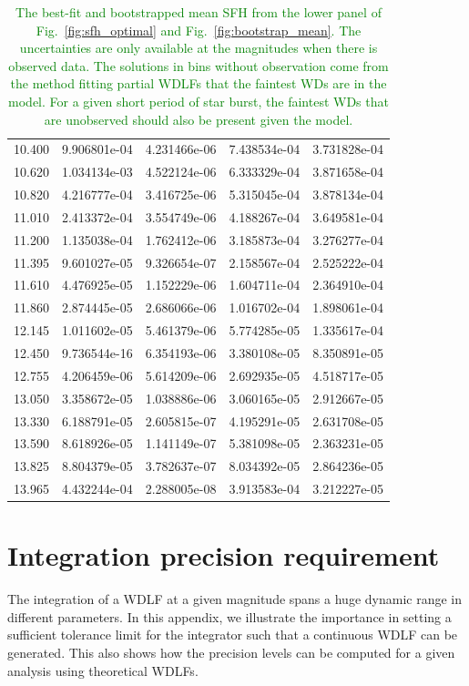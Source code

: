 \documentclass[fleqn,usenatbib]{mnras}
\begin{document}
\begin{table}
\begin{tabular}{c|cc|cc}
    10.400 & 9.906801e-04 & 4.231466e-06 & 7.438534e-04 & 3.731828e-04 \\
    10.620 & 1.034134e-03 & 4.522124e-06 & 6.333329e-04 & 3.871658e-04 \\
    10.820 & 4.216777e-04 & 3.416725e-06 & 5.315045e-04 & 3.878134e-04 \\ \hline
    11.010 & 2.413372e-04 & 3.554749e-06 & 4.188267e-04 & 3.649581e-04 \\
    11.200 & 1.135038e-04 & 1.762412e-06 & 3.185873e-04 & 3.276277e-04 \\
    11.395 & 9.601027e-05 & 9.326654e-07 & 2.158567e-04 & 2.525222e-04 \\
    11.610 & 4.476925e-05 & 1.152229e-06 & 1.604711e-04 & 2.364910e-04 \\
    11.860 & 2.874445e-05 & 2.686066e-06 & 1.016702e-04 & 1.898061e-04 \\ \hline
    12.145 & 1.011602e-05 & 5.461379e-06 & 5.774285e-05 & 1.335617e-04 \\
    12.450 & 9.736544e-16 & 6.354193e-06 & 3.380108e-05 & 8.350891e-05 \\
    12.755 & 4.206459e-06 & 5.614209e-06 & 2.692935e-05 & 4.518717e-05 \\
    13.050 & 3.358672e-05 & 1.038886e-06 & 3.060165e-05 & 2.912667e-05 \\
    13.330 & 6.188791e-05 & 2.605815e-07 & 4.195291e-05 & 2.631708e-05 \\ \hline
    13.590 & 8.618926e-05 & 1.141149e-07 & 5.381098e-05 & 2.363231e-05 \\
    13.825 & 8.804379e-05 & 3.782637e-07 & 8.034392e-05 & 2.864236e-05 \\
    13.965 & 4.432244e-04 & 2.288005e-08 & 3.913583e-04 & 3.212227e-05
    \end{tabular}
    \caption{\textcolor{green}{The best-fit and bootstrapped mean SFH from the lower panel of
    Fig.~\ref{fig:sfh_optimal} and Fig.~\ref{fig:bootstrap_mean}. The uncertainties are only available at the
    magnitudes when there is observed data. The solutions in bins without
    observation come from the method fitting partial WDLFs that the faintest
    WDs are in the model. For a given short period of star burst, the faintest
    WDs that are unobserved should also be present given the model.}}
    \label{tab:sfh}
\end{table}

\section{Integration precision requirement}
\label{appexdix:integration-precision}
The integration of a WDLF at a given magnitude spans a huge dynamic range in
different parameters. In this appendix, we illustrate the importance in setting
a sufficient tolerance limit for the integrator such that a continuous WDLF can
be generated. This also shows how the precision levels can be computed for 
a given analysis using theoretical WDLFs.
\end{document}

